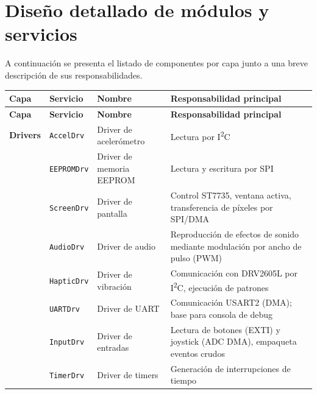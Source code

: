 \documentclass[11pt,a4paper]{article}
\begin{document}
\section{Diseño detallado de módulos y servicios}

A continuación se presenta el listado de componentes por capa junto a una breve descripción de sus responsabilidades.

\begin{longtable}{|p{2cm}|l|p{3cm}|p{6.5cm}|}
\hline
\textbf{Capa} & \textbf{Servicio } & \textbf{Nombre} & \textbf{Responsabilidad principal} \\
\hline
\endfirsthead
\cline{1-1}
\endfoot

\hline
\textbf{Capa} & \textbf{Servicio } & \textbf{Nombre} & \textbf{Responsabilidad principal} \\
\hline
\endhead
\cline{1-1}
\endlastfoot

\textbf{Drivers} & \texttt{AccelDrv} & Driver de acelerómetro & Lectura por I\textsuperscript{2}C \\
\cline{2-4}
& \texttt{EEPROMDrv} & Driver de memoria EEPROM & Lectura y escritura por SPI \\
\cline{2-4}
& \texttt{ScreenDrv} & Driver de pantalla & Control ST7735, ventana activa, transferencia de píxeles por SPI/DMA \\
\cline{2-4}
& \texttt{AudioDrv} & Driver de audio & Reproducción de efectos de sonido mediante modulación por ancho de pulso (PWM) \\
\cline{2-4}
& \texttt{HapticDrv} & Driver de vibración & Comunicación con DRV2605L por I\textsuperscript{2}C, ejecución de patrones \\
\cline{2-4}
& \texttt{UARTDrv} & Driver de UART & Comunicación USART2 (DMA); base para consola de debug \\
\cline{2-4}
& \texttt{InputDrv} & Driver de entradas & Lectura de botones (EXTI) y joystick (ADC DMA), empaqueta eventos crudos \\
\cline{2-4}
& \texttt{TimerDrv} & Driver de timers & Generación de interrupciones de tiempo \\
\hline


\end{longtable}
\end{document}
